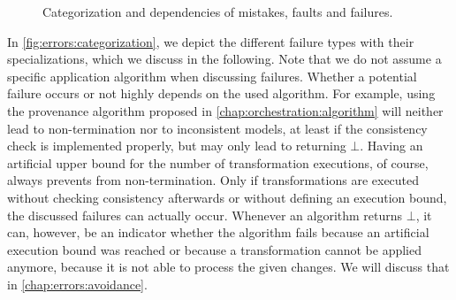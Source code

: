 \begin{figure}
    \centering
    
    \caption[Categorization of mistakes, faults and failures]{Categorization and dependencies of mistakes, faults and failures.}
    \label{fig:errors:categorization}
\end{figure}

In \autoref{fig:errors:categorization}, we depict the different failure types with their specializations, which we discuss in the following.
Note that we do not assume a specific application algorithm when discussing failures.
Whether a potential failure occurs or not highly depends on the used algorithm.
For example, using the provenance algorithm proposed in \autoref{chap:orchestration:algorithm} will neither lead to non-termination nor to inconsistent models, at least if the consistency check is implemented properly, but may only lead to returning $\bot$.
Having an artificial upper bound for the number of transformation executions, of course, always prevents from non-termination.
Only if transformations are executed without checking consistency afterwards or without defining an execution bound, the discussed failures can actually occur.
Whenever an algorithm returns $\bot$, it can, however, be an indicator whether the algorithm fails because an artificial execution bound was reached or because a transformation cannot be applied anymore, because it is not able to process the given changes.
We will discuss that in \autoref{chap:errors:avoidance}.


